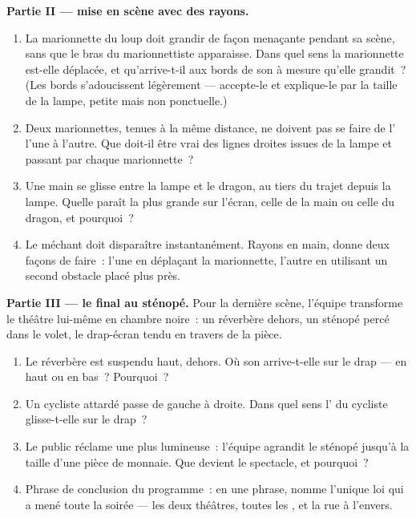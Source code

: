 \begin{problem}
\medskip\noindent\textbf{Partie II --- mise en scène avec des
rayons.}
\begin{enumerate}[resume]
  \item La marionnette du loup doit grandir de façon menaçante
        pendant sa scène, sans que le bras du marionnettiste
        apparaisse. Dans quel sens la marionnette est-elle
        déplacée, et qu'arrive-t-il aux bords de son  à mesure
        qu'elle grandit~? (Les bords s'adoucissent légèrement ---
        accepte-le et explique-le par la taille de la lampe,
        petite mais non ponctuelle.)
  \item Deux marionnettes, tenues à la même distance, ne doivent
        pas se faire de l' l'une à l'autre. Que doit-il être
        vrai des lignes droites issues de la lampe et passant par
        chaque marionnette~?
  \item Une main se glisse entre la lampe et le dragon, au tiers du
        trajet depuis la lampe. Quelle  paraît la plus grande
        sur l'écran, celle de la main ou celle du dragon, et
        pourquoi~?
  \item Le méchant doit disparaître instantanément. Rayons en main,
        donne deux façons de faire~: l'une en déplaçant la
        marionnette, l'autre en utilisant un second obstacle placé
        plus près.
\end{enumerate}

\medskip\noindent\textbf{Partie III --- le final au sténopé.}
Pour la dernière scène, l'équipe transforme le théâtre lui-même en
chambre noire~: un réverbère dehors, un sténopé percé dans le volet,
le drap-écran tendu en travers de la pièce.
\begin{enumerate}[resume]
  \item Le réverbère est suspendu haut, dehors. Où son 
        arrive-t-elle sur le drap --- en haut ou en bas~? Pourquoi~?
  \item Un cycliste attardé passe de gauche à droite. Dans quel
        sens l' du cycliste glisse-t-elle sur le drap~?
  \item Le public réclame une  plus lumineuse~: l'équipe
        agrandit le sténopé jusqu'à la taille d'une pièce de
        monnaie. Que devient le spectacle, et pourquoi~?
  \item Phrase de conclusion du programme~: en une phrase, nomme
        l'unique loi qui a mené toute la soirée --- les deux
        théâtres, toutes les , et la rue à l'envers.
\end{enumerate}
\end{problem}
